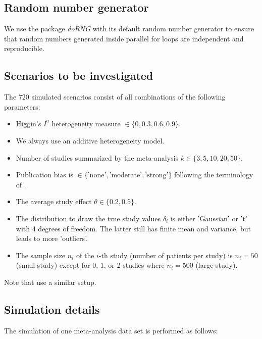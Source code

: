 \documentclass[letterpaper, 12pt]{article}
\newcommand{\pkg}[1]{\textit{#1}}
\begin{document}
\subsection{Random number generator}
We use the package \pkg{doRNG} with its default random number generator to
ensure that random numbers generated inside parallel for loops are independent
and reproducible.


\subsection{Scenarios to be investigated} \label{sec:scenario}
The $720$  simulated scenarios consist of all combinations
of the following parameters:
\begin{itemize}
\item Higgin's $I^2$ heterogeneity measure $\in \{0, 0.3, 0.6, 0.9\}$.
\item We always use an additive heterogeneity model. 
\item Number of studies summarized by the meta-analysis $k \in \{3, 5, 10, 20, 50\}$.
\item Publication bias is  $\in \{\text{'none'}, \text{'moderate'}, \text{'strong'}\}$
  following the terminology of \citet{henm:copa:10}. 
\item The average study effect $\theta \in \{0.2, 0.5\}$. 
\item The distribution to draw the true study values $\delta_i$ is either
  'Gaussian' or 't' with 4 degrees of freedom. The latter still has finite mean
    and variance, but leads to more 'outliers'.
\item The sample size $n_i$ of the $i$-th study (number of patients per study)
  is $n_i = 50$ (small study) except for 0, 1, or 2 studies where
  $n_i=500$ (large study). 
\end{itemize}

Note that \citet{IntHoutIoannidis} use a similar setup.

\subsection{Simulation details}

The simulation of one meta-analysis data set is performed as follows:
\end{document}
